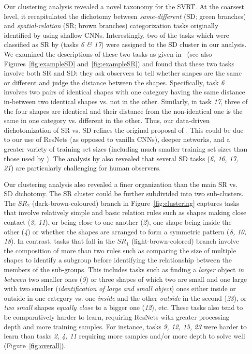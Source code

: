 Our clustering analysis revealed a novel taxonomy for the SVRT.
At the coarsest level, it recapitulated the dichotomy between \textit{same-different} (SD; green branches) and \textit{spatial-relation} (SR; \textcolor{black}{brown} branches) categorization tasks originally identified by \citet{kim2018not} using shallow CNNs. Interestingly, two of the tasks which were classified as SR by \citet{kim2018not} (tasks \textit{6 \& 17}) were assigned to the SD cluster in our analysis. We examined the descriptions of these two tasks as given in~\citet{fleuret2011comparing} (see also Figures~\ref{fig:exampleSD} and~\ref{fig:exampleSR}) and found that these two tasks involve both SR and SD: they ask observers to tell whether shapes are the same or different and judge the distance between the shapes. Specifically, task \textit{6} involves two pairs of identical shapes with one category having the same distance in-between two identical shapes vs. not in the other. Similarly, in task \textit{17}, three of the four shapes are identical and their distance from the non-identical one is the same in one category vs. different in the other. Thus, our data-driven dichotomization of SR vs. SD refines the original proposal of \citet{kim2018not}. This could be due to our use of ResNets (as opposed to vanilla CNNs), deeper networks, and a greater variety of training set sizes (including much smaller training set sizes than those used by \citet{kim2018not}). \textcolor{black}{The analysis by \citet{fleuret2011comparing} also revealed that several SD tasks (\textit{6, 16, 17, 21}) are particularly challenging for human observers.}


Our clustering analysis also revealed a finer organization than the main SR vs. SD dichotomy. The SR cluster could be further subdivided into two sub-clusters. The $SR_2$ (dark-brown-coloured) branch in Figure~\ref{fig:clustering} captures tasks that involve relatively simple and basic relation rules such as shapes making close contact (\textit{3, 11}), or being close to one another (\textit{2}), one shape being inside the other (\textit{4}) or whether the shapes are arranged to form a symmetric pattern (\textit{8, 10, 18}). In contrast, tasks that fall in the $SR_1$ (light-brown-colored) branch involve the composition of more than two rules such as comparing the size of multiple shapes to identify a subgroup before identifying the relationship between the members of the sub-groups. This includes tasks such as finding a \textit{larger} object \textit{in between} two smaller ones (\textit{9}) or three shapes of which two are small and one large with two smaller (\textit{identification of large and small object}) ones either inside or outside in one category vs. one \textit{inside} and the other \textit{outside} in the second (\textit{23}), or \textit{two small} shapes \textit{equally close} to a bigger one (\textit{12}), etc. These tasks also tend to be comparatively harder to learn, requiring ResNets with greater processing depth and more training samples. For instance, tasks \textit{9, 12, 15, 23} were harder to learn than tasks \textit{2, 4, 11} requiring more samples and/or more depth to solve well (Figure~\ref{fig:overall}).



